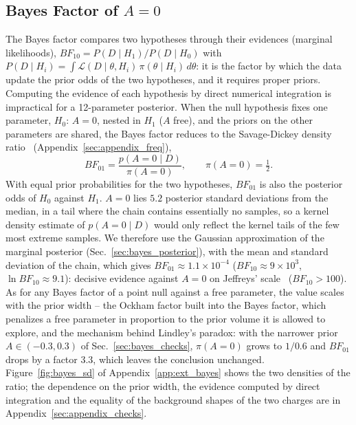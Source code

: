 \subsection{Bayes Factor of $A=0$}
The Bayes factor compares two hypotheses through their evidences (marginal likelihoods), $BF_{10}=P(D\mid H_1)/P(D\mid H_0)$ with $P(D\mid H_i)=\int\mathcal{L}(D\mid\theta,H_i)\,\pi(\theta\mid H_i)\,d\theta$: it is the factor by which the data update the prior odds of the two hypotheses, and it requires proper priors. Computing the evidence of each hypothesis by direct numerical integration is impractical for a 12-parameter posterior. When the null hypothesis fixes one parameter, $H_0$: $A=0$, nested in $H_1$ ($A$ free), and the priors on the other parameters are shared, the Bayes factor reduces to the Savage-Dickey density ratio~\cite{dickey1971} (Appendix~\ref{sec:appendix_freq}),
\[
BF_{01} = \frac{p(A=0\mid D)}{\pi(A=0)}, \qquad \pi(A=0)=\tfrac12 .
\]
With equal prior probabilities for the two hypotheses, $BF_{01}$ is also the posterior odds of $H_0$ against $H_1$. $A=0$ lies $5.2$ posterior standard deviations from the median, in a tail where the chain contains essentially no samples, so a kernel density estimate of $p(A=0\mid D)$ would only reflect the kernel tails of the few most extreme samples. We therefore use the Gaussian approximation of the marginal posterior (Sec.~\ref{sec:bayes_posterior}), with the mean and standard deviation of the chain, which gives $BF_{01}\approx1.1\times10^{-4}$ ($BF_{10}\approx9\times10^{3}$, $\ln BF_{10}\approx9.1$): decisive evidence against $A=0$ on Jeffreys' scale~\cite{jeffreys} ($BF_{10}>100$). As for any Bayes factor of a point null against a free parameter, the value scales with the prior width -- the Ockham factor built into the Bayes factor, which penalizes a free parameter in proportion to the prior volume it is allowed to explore, and the mechanism behind Lindley's paradox: with the narrower prior $A\in(-0.3,0.3)$ of Sec.~\ref{sec:bayes_checks}, $\pi(A=0)$ grows to $1/0.6$ and $BF_{01}$ drops by a factor $3.3$, which leaves the conclusion unchanged. Figure~\ref{fig:bayes_sd} of Appendix~\ref{app:ext_bayes} shows the two densities of the ratio; the dependence on the prior width, the evidence computed by direct integration and the equality of the background shapes of the two charges are in Appendix~\ref{sec:appendix_checks}.

